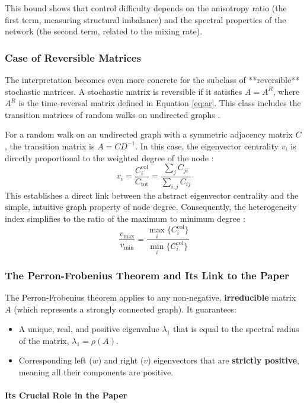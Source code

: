 \documentclass[11pt, a4paper]{article}
\begin{document}
This bound shows that control difficulty depends on the anisotropy ratio (the first term, measuring structural imbalance) and the spectral properties of the network (the second term, related to the mixing rate).
\subsubsection{Case of Reversible Matrices}
The interpretation becomes even more concrete for the subclass of **reversible** stochastic matrices. A stochastic matrix is reversible if it satisfies $A=A^R$, where $A^R$ is the time-reversal matrix defined in Equation \ref{eq:ar}. This class includes the transition matrices of random walks on undirected graphs \cite{552}.

For a random walk on an undirected graph with a symmetric adjacency matrix $C$, the transition matrix is $A=CD^{-1}$. In this case, the eigenvector centrality $v_i$ is directly proportional to the weighted degree of the node \cite{580-581}:
\begin{equation}
    v_i = \frac{C_{i}^{\text{col}}}{C_{\text{tot}}} = \frac{\sum_{j}C_{ji}}{\sum_{i,j}C_{ij}}
\end{equation}
This establishes a direct link between the abstract eigenvector centrality and the simple, intuitive graph property of node degree. Consequently, the heterogeneity index simplifies to the ratio of the maximum to minimum degree \cite{582-583}:
\begin{equation}
    \frac{v_{\max}}{v_{\min}} = \frac{\max_{i}\{C_{i}^{\text{col}}\}}{\min_{i}\{C_{i}^{\text{col}}\}}
\end{equation}
\subsubsection*{The Perron-Frobenius Theorem and Its Link to the Paper}
The Perron-Frobenius theorem applies to any non-negative, \textbf{irreducible} matrix $A$ (which represents a strongly connected graph). It guarantees:
\begin{itemize}
    \item A unique, real, and positive eigenvalue $\lambda_1$ that is equal to the spectral radius of the matrix, $\lambda_1 = \rho(A)$.
    \item Corresponding left ($w$) and right ($v$) eigenvectors that are \textbf{strictly positive}, meaning all their components are positive.
\end{itemize}

\paragraph{Its Crucial Role in the Paper}
\end{document}

